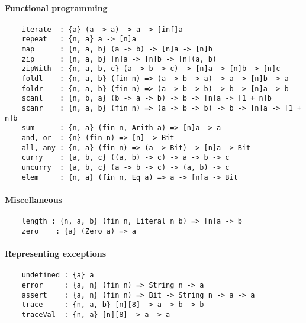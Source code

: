 \paragraph*{Functional programming}
\begin{Verbatim}
    iterate  : {a} (a -> a) -> a -> [inf]a
    repeat   : {n, a} a -> [n]a
    map      : {n, a, b} (a -> b) -> [n]a -> [n]b
    zip      : {n, a, b} [n]a -> [n]b -> [n](a, b)
    zipWith  : {n, a, b, c} (a -> b -> c) -> [n]a -> [n]b -> [n]c
    foldl    : {n, a, b} (fin n) => (a -> b -> a) -> a -> [n]b -> a
    foldr    : {n, a, b} (fin n) => (a -> b -> b) -> b -> [n]a -> b
    scanl    : {n, b, a} (b -> a -> b) -> b -> [n]a -> [1 + n]b
    scanr    : {n, a, b} (fin n) => (a -> b -> b) -> b -> [n]a -> [1 + n]b
    sum      : {n, a} (fin n, Arith a) => [n]a -> a
    and, or  : {n} (fin n) => [n] -> Bit
    all, any : {n, a} (fin n) => (a -> Bit) -> [n]a -> Bit
    curry    : {a, b, c} ((a, b) -> c) -> a -> b -> c
    uncurry  : {a, b, c} (a -> b -> c) -> (a, b) -> c
    elem     : {n, a} (fin n, Eq a) => a -> [n]a -> Bit
\end{Verbatim}
\paragraph*{Miscellaneous}
\begin{Verbatim}
    length : {n, a, b} (fin n, Literal n b) => [n]a -> b
    zero    : {a} (Zero a) => a
\end{Verbatim}
\paragraph*{Representing exceptions}
\begin{Verbatim}
    undefined : {a} a
    error     : {a, n} (fin n) => String n -> a
    assert    : {a, n} (fin n) => Bit -> String n -> a -> a
    trace     : {n, a, b} [n][8] -> a -> b -> b
    traceVal  : {n, a} [n][8] -> a -> a
\end{Verbatim}

